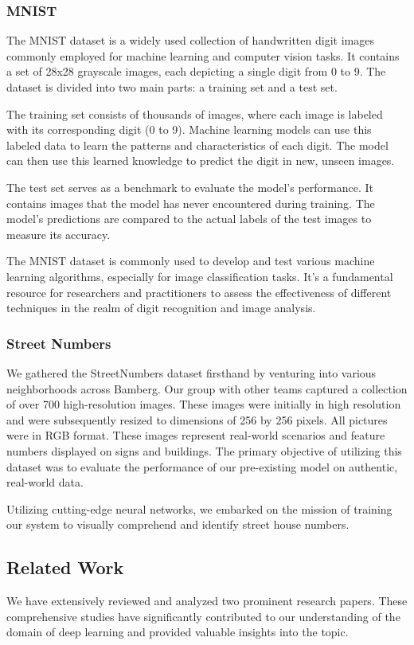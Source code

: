 \documentclass[12pt,a4paper]{article}
\begin{document}
\subsubsection{MNIST}
The MNIST dataset is a widely used collection of handwritten digit images commonly employed for machine learning and computer vision tasks. It contains a set of 28x28 grayscale images, each depicting a single digit from 0 to 9. The dataset is divided into two main parts: a training set and a test set. 

The training set consists of thousands of images, where each image is labeled with its corresponding digit (0 to 9). Machine learning models can use this labeled data to learn the patterns and characteristics of each digit. The model can then use this learned knowledge to predict the digit in new, unseen images. 

The test set serves as a benchmark to evaluate the model's performance. It contains images that the model has never encountered during training. The model's predictions are compared to the actual labels of the test images to measure its accuracy. 

The MNIST dataset is commonly used to develop and test various machine learning algorithms, especially for image classification tasks. It's a fundamental resource for researchers and practitioners to assess the effectiveness of different techniques in the realm of digit recognition and image analysis.

\subsubsection{Street Numbers}
We gathered the StreetNumbers dataset firsthand by venturing into various neighborhoods across Bamberg. Our group with other teams captured a collection of over 700 high-resolution images. These images were initially in high resolution and were subsequently resized to dimensions of 256 by 256 pixels. All pictures were in RGB format. These images represent real-world scenarios and feature numbers displayed on signs and buildings. The primary objective of utilizing this dataset was to evaluate the performance of our pre-existing model on authentic, real-world data. 

Utilizing cutting-edge neural networks, we embarked on the mission of training our system to visually comprehend and identify street house numbers.

\subsection{Related Work}
We have extensively reviewed and analyzed two prominent research papers. These comprehensive studies have significantly contributed to our understanding of the domain of deep learning and provided valuable insights into the topic.
\end{document}
